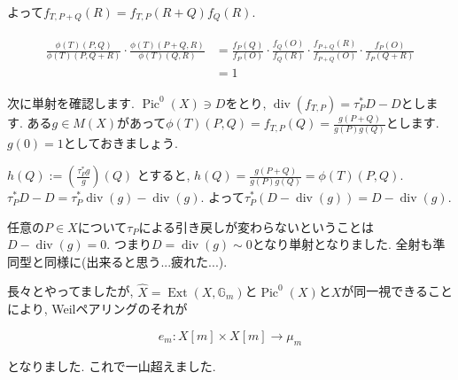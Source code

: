 \documentclass{jsarticle}
\newcommand{\GG}{\mathbb{G}}
\newcommand{\makeop}[1]{\mathop{\mathrm{#1}}\nolimits}
\def\Ext{\makeop{Ext}}
\def\Pic{\makeop{Pic}}
\def\div{\makeop{div}}
\theoremstyle{definition}
\numberwithin{theorem}{section}
\begin{document}
よって$f_{T, P+Q}(R) = f_{T, P}(R+Q) f_Q(R)$.

\begin{eqnarray*}
\begin{aligned}
\frac{\phi(T)(P, Q) }{\phi(T)(P, Q+R)} \cdot \frac{\phi(T)(P+Q, R)}{\phi(T)(Q, R)}
&= \frac{f_P(Q)}{f_P(O)} \cdot \frac{f_Q(O)}{f_Q(R)} \cdot \frac{f_{P+Q}(R)}{f_{P+Q}(O)} \cdot \frac{f_P(O)}{f_P(Q+R)}\\
&= 1
\end{aligned}
\end{eqnarray*}

次に単射を確認します. $\Pic^0(X) \ni D$をとり, $\div(f_{T, P}) = \tau_P^*D - D$とします. ある$g \in M(X)$があって$\displaystyle\phi(T)(P, Q) = f_{T, P}(Q) = \frac{g(P+Q)}{g(P) g(Q)}$とします. $g(0) = 1$としておきましょう.

$h(Q) := \left(\frac{\tau_P^*g}{g}\right)(Q)$ とすると, $h(Q) = \frac{g(P+Q)}{g(P)g(Q)} = \phi(T)(P, Q)$. $\tau_P^*D - D =\tau_P^*\div(g) - \div(g)$. よって$\tau_P^*(D - \div(g)) = D - \div(g)$.

任意の$P \in X$について$\tau_P$による引き戻しが変わらないということは$D - \div(g) = 0$. つまり$D = \div(g) \sim 0$となり単射となりました. 全射も準同型と同様に(出来ると思う...疲れた...).

長々とやってましたが, $\hat{X} = \Ext(X, \GG_m)$と$\Pic^0(X)$と$X$が同一視できることにより, Weilペアリングのそれが

\begin{equation*}
e_m: X[m] \times X[m] \rightarrow \mu_m
\end{equation*}

となりました. これで一山超えました.
\end{document}
